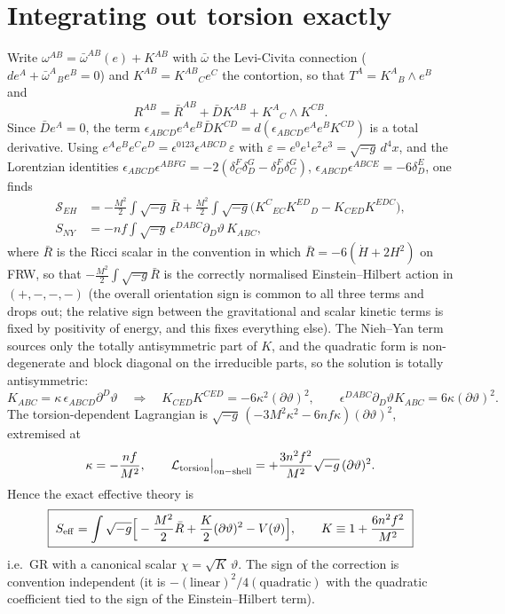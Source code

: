 \documentclass[11pt]{article}
\begin{document}
\section{Integrating out torsion exactly}
Write $\omega^{AB}=\bar\omega^{AB}(e)+K^{AB}$ with $\bar\omega$ the Levi-Civita connection ($de^A+\bar\omega^A{}_Be^B=0$) and $K^{AB}=K^{AB}{}_Ce^C$ the contortion, so that $T^A=K^A{}_B\wedge e^B$ and
\begin{equation}
R^{AB}=\bar R^{AB}+\bar DK^{AB}+K^A{}_C\wedge K^{CB}.
\end{equation}
Since $\bar De^A=0$, the term $\epsilon_{ABCD}e^Ae^B\bar DK^{CD}=d(\epsilon_{ABCD}e^Ae^BK^{CD})$ is a total derivative. Using $e^Ae^Be^Ce^D=\epsilon^{0123}\epsilon^{ABCD}\,\varepsilon$ with $\varepsilon=e^0e^1e^2e^3=\sqrt{-g}\,d^4x$, and the Lorentzian identities $\epsilon_{ABCD}\epsilon^{ABFG}=-2(\delta^F_C\delta^G_D-\delta^F_D\delta^G_C)$, $\epsilon_{ABCD}\epsilon^{ABCE}=-6\delta^E_D$, one finds
\begin{align}
\mathcal S_{EH}&=-\frac{M^2}{2}\int\sqrt{-g}\,\bar R+\frac{M^2}{2}\int\sqrt{-g}\big(K^C{}_{EC}K^{ED}{}_D-K_{CED}K^{EDC}\big),\\
S_{NY}&=-nf\int\sqrt{-g}\,\epsilon^{DABC}\partial_D\vartheta\,K_{ABC},
\end{align}
where $\bar R$ is the Ricci scalar in the convention in which $\bar R=-6(\dot H+2H^2)$ on FRW, so that $-\frac{M^2}{2}\int\sqrt{-g}\bar R$ is the correctly normalised Einstein--Hilbert action in $(+,-,-,-)$ (the overall orientation sign is common to all three terms and drops out; the relative sign between the gravitational and scalar kinetic terms is fixed by positivity of energy, and this fixes everything else). The Nieh--Yan term sources only the totally antisymmetric part of $K$, and the quadratic form is non-degenerate and block diagonal on the irreducible parts, so the solution is totally antisymmetric:
\begin{equation}
K_{ABC}=\kappa\,\epsilon_{ABCD}\partial^D\vartheta\quad\Rightarrow\quad
K_{CED}K^{CED}=-6\kappa^2(\partial\vartheta)^2,\qquad \epsilon^{DABC}\partial_D\vartheta K_{ABC}=6\kappa(\partial\vartheta)^2 .
\end{equation}
The torsion-dependent Lagrangian is $\sqrt{-g}\,(-3M^2\kappa^2-6nf\kappa)(\partial\vartheta)^2$, extremised at
\begin{equation}
\kappa=-\frac{nf}{M^2},\qquad \mathcal L_{\rm torsion}\big|_{\rm on-shell}=+\frac{3n^2f^2}{M^2}\sqrt{-g}\,(\partial\vartheta)^2 .
\end{equation}
Hence the exact effective theory is
\begin{equation}
\boxed{\;S_{\rm eff}=\int\sqrt{-g}\Big[-\frac{M^2}{2}\bar R+\frac{K}{2}(\partial\vartheta)^2-V(\vartheta)\Big],\qquad K\equiv1+\frac{6n^2f^2}{M^2}\;}
\label{eq:Seff}
\end{equation}
i.e.\ GR with a canonical scalar $\chi=\sqrt K\,\vartheta$. The sign of the correction is convention independent (it is $-(\text{linear})^2/4(\text{quadratic})$ with the quadratic coefficient tied to the sign of the Einstein--Hilbert term).
\end{document}
